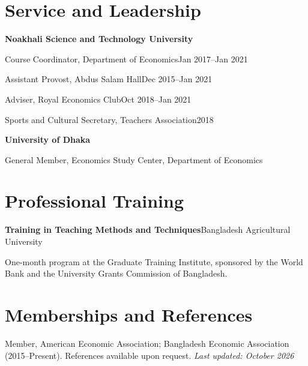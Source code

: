 \documentclass[11pt]{article}
\newcommand{\cvitem}[2]{%
  \textbf{#1}\hfill #2\par\nopagebreak
}
\newcommand{\cvline}[2]{%
  #1\hfill #2\par
}
\begin{document}
\section*{Service and Leadership}
\textbf{Noakhali Science and Technology University}\par
\cvline{Course Coordinator, Department of Economics}{Jan 2017--Jan 2021}
\cvline{Assistant Provost, Abdus Salam Hall}{Dec 2015--Jan 2021}
\cvline{Adviser, Royal Economics Club}{Oct 2018--Jan 2021}
\cvline{Sports and Cultural Secretary, Teachers Association}{2018}
\textbf{University of Dhaka}\par
\cvline{General Member, Economics Study Center, Department of Economics}{}

\section*{Professional Training}
\cvitem{Training in Teaching Methods and Techniques}{Bangladesh Agricultural University}
One-month program at the Graduate Training Institute, sponsored by the World Bank and the
University Grants Commission of Bangladesh.

\section*{Memberships and References}
Member, American Economic Association; Bangladesh Economic Association (2015--Present).
References available upon request.
\hfill{\small\textit{Last updated: October 2026}}
\end{document}

